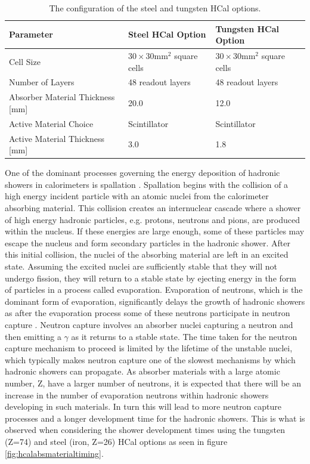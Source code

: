 \begin{table}[h!]
\centering
\begin{tabular}{ l l l }
\hline
Parameter & Steel HCal Option & Tungsten HCal Option \\
\hline
Cell Size & $30 \times 30 \text{mm}^{2}$ square cells & $30 \times 30 \text{mm}^{2}$ square cells\\
Number of Layers & 48 readout layers & 48 readout layers\\
Absorber Material Thickness [mm] & 20.0 & 12.0 \\
Active Material Choice & Scintillator & Scintillator \\
Active Material Thickness [mm] & 3.0 & 1.8 \\
\hline
\end{tabular}
\caption[The configuration of the steel and tungsten HCal options.]{The configuration of the steel and tungsten HCal options.}
\label{table:hcalabsmaterial}
\end{table}

One of the dominant processes governing the energy deposition of hadronic showers in calorimeters is spallation \cite{Wigmans:2000vf}.  Spallation begins with the collision of a high energy incident particle with an atomic nuclei from the calorimeter absorbing material.  This collision creates an internuclear cascade where a shower of high energy hadronic particles, e.g. protons, neutrons and pions, are produced within the nucleus.  If these energies are large enough, some of these particles may escape the nucleus and form secondary particles in the hadronic shower.  After this initial collision, the nuclei of the absorbing material are left in an excited state.  Assuming the excited nuclei are sufficiently stable that they will not undergo fission, they will return to a stable state by ejecting energy in the form of particles in a process called evaporation.  Evaporation of neutrons, which is the dominant form of evaporation, significantly delays the growth of hadronic showers as after the evaporation process some of these neutrons participate in neutron capture \cite{Adloff:2014rya}.  Neutron capture involves an absorber nuclei capturing a neutron and then emitting a $\gamma$ as it returns to a stable state.  The time taken for the neutron capture mechanism to proceed is limited by the lifetime of the unstable nuclei, which typically makes neutron capture one of the slowest mechanisms by which hadronic showers can propagate.  As absorber materials with a large atomic number, Z, have a larger number of neutrons, it is expected that there will be an increase in the number of evaporation neutrons within hadronic showers developing in such materials.  In turn this will lead to more neutron capture processes and a longer development time for the hadronic showers.  This is what is observed when considering the shower development times using the tungsten (Z=74) and steel (iron, Z=26) HCal options as seen in figure \ref{fig:hcalabsmaterialtiming}. 

